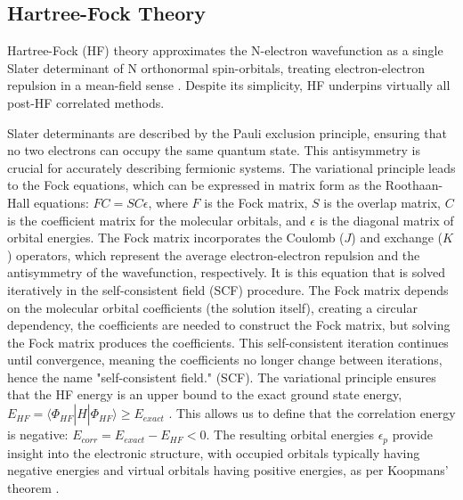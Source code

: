 \subsection{Hartree-Fock Theory}

Hartree-Fock (HF) theory approximates the N-electron wavefunction as a single Slater determinant of N orthonormal spin-orbitals, treating electron-electron repulsion in a mean-field sense \cite{Helgaker2000}. Despite its simplicity, HF underpins virtually all post-HF correlated methods.

Slater determinants are described by the Pauli exclusion principle, ensuring that no two electrons can occupy the same quantum state. This antisymmetry is crucial for accurately describing fermionic systems. The variational principle leads to the Fock equations, which can be expressed in matrix form as the Roothaan-Hall equations\cite{Helgaker2000}: \(FC = SC\epsilon\), where \(F\) is the Fock matrix, \(S\) is the overlap matrix, \(C\) is the coefficient matrix for the molecular orbitals, and \(\epsilon\) is the diagonal matrix of orbital energies. The Fock matrix incorporates the Coulomb ($J$) and exchange ($K$) operators, which represent the average electron-electron repulsion and the antisymmetry of the wavefunction, respectively. It is this equation that is solved iteratively in the self-consistent field (SCF) procedure. The Fock matrix depends on the molecular orbital coefficients (the solution itself), creating a circular dependency, the coefficients are needed to construct the Fock matrix, but solving the Fock matrix produces the coefficients. This self-consistent iteration continues until convergence, meaning the coefficients no longer change between iterations, hence the name "self-consistent field." (SCF). %
The variational principle ensures that the HF energy is an upper bound to the exact ground state energy, \(E_{HF} = \langle \Phi_{HF} | \hat{H} | \Phi_{HF} \rangle \geq E_{exact}\) \cite{SzaboOstlund1989}. This allows us to define that the correlation energy is negative: \(E_{corr} = E_{exact} - E_{HF} < 0\). The resulting orbital energies $\epsilon_p$ provide insight into the electronic structure, with occupied orbitals typically having negative energies and virtual orbitals having positive energies, as per Koopmans' theorem \cite{Helgaker2000}. %

